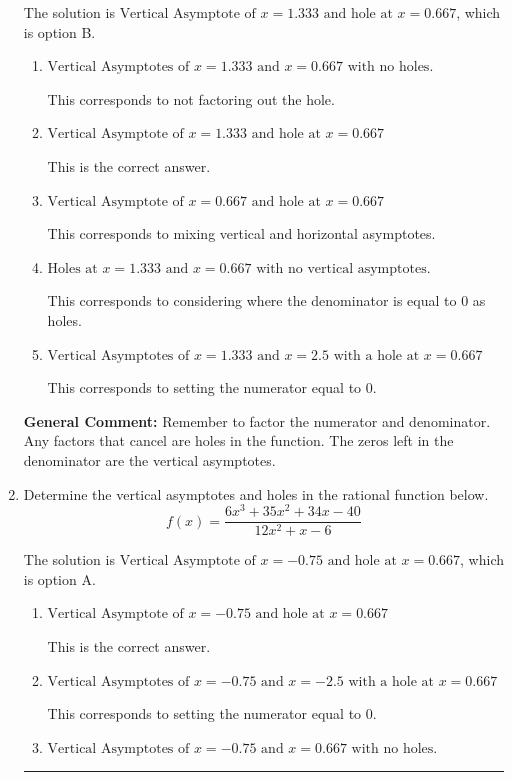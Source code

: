 \documentclass{extbook}[14pt]
\newcommand{\litem}[1]{\item #1

\rule{\textwidth}{0.4pt}}
\begin{document}
\begin{enumerate}
{The solution is \( \text{Vertical Asymptote of } x = 1.333 \text{ and hole at } x = 0.667 \), which is option B.\begin{enumerate}[label=\Alph*.]
\item \( \text{Vertical Asymptotes of } x = 1.333 \text{ and } x = 0.667 \text{ with no holes.} \)

This corresponds to not factoring out the hole.
\item \( \text{Vertical Asymptote of } x = 1.333 \text{ and hole at } x = 0.667 \)

This is the correct answer.
\item \( \text{Vertical Asymptote of } x = 0.667 \text{ and hole at } x = 0.667 \)

This corresponds to mixing vertical and horizontal asymptotes.
\item \( \text{Holes at } x = 1.333 \text{ and } x = 0.667 \text{ with no vertical asymptotes.} \)

This corresponds to considering where the denominator is equal to 0 as holes.
\item \( \text{Vertical Asymptotes of } x = 1.333 \text{ and } x = 2.5 \text{ with a hole at } x = 0.667 \)

This corresponds to setting the numerator equal to 0.
\end{enumerate}

\textbf{General Comment:} Remember to factor the numerator and denominator. Any factors that cancel are holes in the function. The zeros left in the denominator are the vertical asymptotes.
}
\litem{
Determine the vertical asymptotes and holes in the rational function below.
\[ f(x) = \frac{6x^{3} +35 x^{2} +34 x -40}{12x^{2} +x -6} \]

The solution is \( \text{Vertical Asymptote of } x = -0.75 \text{ and hole at } x = 0.667 \), which is option A.\begin{enumerate}[label=\Alph*.]
\item \( \text{Vertical Asymptote of } x = -0.75 \text{ and hole at } x = 0.667 \)

This is the correct answer.
\item \( \text{Vertical Asymptotes of } x = -0.75 \text{ and } x = -2.5 \text{ with a hole at } x = 0.667 \)

This corresponds to setting the numerator equal to 0.
\item \( \text{Vertical Asymptotes of } x = -0.75 \text{ and } x = 0.667 \text{ with no holes.} \)


\end{enumerate}}
\end{enumerate}
\end{document}
